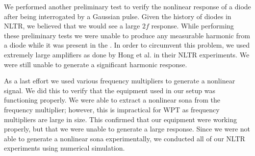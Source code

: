 We performed another preliminary test to verify the nonlinear response of a diode after being interrogated by a Gaussian pulse. Given the history of diodes in NLTR, we believed that we would see a large $2f$ response. While performing these preliminary tests we were unable to produce any measurable harmonic from a diode while it was present in the \giga{}. In order to circumvent this problem, we used extremely large amplifiers as done by Hong et al. in their NLTR experiments. We were still unable to generate a significant harmonic response.

As a last effort we used various frequency multipliers to generate a nonlinear signal. We did this to verify that the equipment used in our setup was functioning properly. We were able to extract a nonlinear sona from the frequency multiplier; however, this is impractical for WPT as frequency multipliers are large in size. This confirmed that our equipment were working properly, but that we were unable to generate a large response. Since we were not able to generate a nonlinear sona experimentally, we conducted all of our NLTR experiments using numerical simulation.
